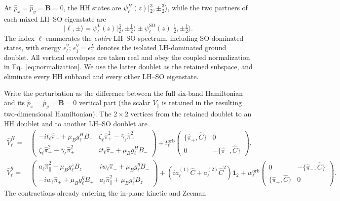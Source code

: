 \documentclass[10pt,letterpaper]{article}
\newcommand{\ket}[1]{\lvert #1\rangle}
\newcommand{\ep}{\epsilon}
\newcommand{\SO}{\mathrm{SO}}
\newcommand{\one}{\mathbf 1}
\begin{document}
At $\hat p_x=\hat p_y=\bm B=0$, the HH states are
$\psi_\ell^H(z)\ket{\tfrac32,\pm\tfrac32}$, while the two
partners of each mixed LH--SO eigenstate are
\begin{equation}
 \ket{\ell,\pm}=\psi_\ell^L(z)\ket{\tfrac32,\pm\tfrac12}
 \pm\psi_\ell^{\SO}(z)\ket{\tfrac12,\pm\tfrac12}.
 \label{eq:swt6-partners}
\end{equation}
The index $\ell$ enumerates the \emph{entire} LH--SO spectrum,
including SO-dominated states, with energy $\ep_\ell^\eta$;
$\ep_1^\eta=\ep_1^L$ denotes the isolated LH-dominated ground doublet.
All vertical envelopes are taken real and obey the coupled normalization
in Eq.~\eqref{eq:normalization}. We use the latter doublet as the
retained subspace, and eliminate every HH subband and every other
LH--SO eigenstate.

Write the perturbation as the difference between the full six-band
Hamiltonian and its $\hat p_x=\hat p_y=\bm B=0$ vertical part (the scalar
$V_\parallel$ is retained in the resulting two-dimensional Hamiltonian).
The $2\times2$ vertices from the retained doublet to an HH doublet
and to another LH--SO doublet are
\begin{align}
 \hat V_\ell^H={}&
 \begin{pmatrix}
 -it_\ell\hat\pi_++\mu_Bg_\ell^HB_+&
 \zeta_\ell\hat\pi_+^2-\bar\gamma_\ell\hat\pi_-^2\\
 \zeta_\ell\hat\pi_-^2-\bar\gamma_\ell\hat\pi_+^2&
 it_\ell\hat\pi_-+\mu_Bg_\ell^HB_-
 \end{pmatrix}
 +t_\ell^{\mathrm{orb}}
 \begin{pmatrix}
 \{\hat\pi_+,\hat C\}&0\\
 0&-\{\hat\pi_-,\hat C\}
 \end{pmatrix},\label{eq:swt6-VH}\\
 \hat V_\ell^\eta={}&
 \begin{pmatrix}
 a_\ell\hat\pi_\parallel^2-\mu_Bg_\ell^zB_z&
 iw_\ell\hat\pi_-+\mu_Bg_\ell^\eta B_-\\
 -iw_\ell\hat\pi_++\mu_Bg_\ell^\eta B_+&
 a_\ell\hat\pi_\parallel^2+\mu_Bg_\ell^zB_z
 \end{pmatrix}
 +(ia_\ell^{(1)}\hat C+a_\ell^{(2)}\hat C^2)\one_2
 +w_\ell^{\mathrm{orb}}
 \begin{pmatrix}
 0&-\{\hat\pi_-,\hat C\}\\
 \{\hat\pi_+,\hat C\}&0
 \end{pmatrix}.
 \label{eq:swt6-Veta}
\end{align}
The contractions already entering the in-plane kinetic and Zeeman
\end{document}
